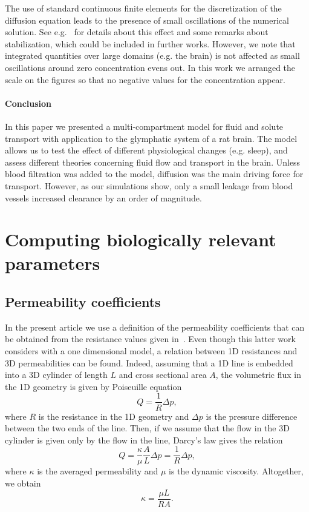 \documentclass[10pt]{article}
\newcommand{\1}{^{(1)}}
\newcommand{\2}{^{(2)}}
\begin{document}
The use of standard continuous finite elements for the discretization of the diffusion equation leads to the presence of small oscillations of the numerical solution. See e.g.~\cite{Mardal-2022-mri} for details about this effect and some remarks about stabilization, which could be included in further works. However, we note that integrated quantities over large domains (e.g. the brain) is not affected as small oscillations around zero concentration evens out. In this work we arranged the scale on the figures so that no negative values for the concentration appear. 


\paragraph{Conclusion}
In this paper we presented a multi-compartment model for fluid and solute transport with application to the glymphatic system of a rat brain. The model allows us to test the effect of different physiological changes (e.g. sleep), and assess different theories concerning fluid flow and transport in the brain. Unless blood filtration was added to the model, diffusion was the main driving force for transport. However, as our simulations show, only a small leakage from blood vessels increased clearance by an order of magnitude. 


\appendix


\section{Computing biologically relevant parameters} \label{app:param-values}
\subsection{Permeability coefficients}

In the present article we use a definition of the permeability coefficients that can be obtained from the resistance values given in~\cite{Vinje-2020-ICP}. Even though this latter work considers with a one dimensional model, a relation between 1D resistances and 3D permeabilities can be found. 
Indeed, assuming that a 1D line is embedded into a 3D cylinder of length $L$ and cross sectional area $A$, the volumetric flux in the 1D geometry is given by Poiseuille equation
\[
    Q = \frac{1}{R} \Delta p,
\]
where $R$ is the resistance in the 1D geometry and $\Delta p$ is the pressure difference between the two ends of the line.
Then, if we assume that the flow in the 3D cylinder is given only by the flow in the line, Darcy's law gives the relation 
\[
    Q = \frac{\kappa}{\mu} \frac{A}{L} \Delta p  = \frac{1}{R} \Delta p,
\]
where $\kappa$ is the averaged permeability and $\mu$ is the dynamic viscosity. 
Altogether, we obtain 
\begin{equation}
\kappa = \frac{\mu L}{R A}.
\label{eq:relation-resistance-permeability}
\end{equation}
\end{document}

